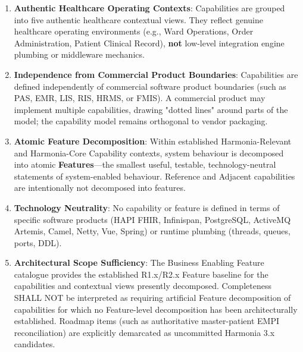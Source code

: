 \begin{enumerate}

\item
\textbf{Authentic Healthcare Operating Contexts}: Capabilities are grouped into five authentic healthcare contextual views. They reflect genuine healthcare operating environments (e.g., Ward Operations, Order Administration, Patient Clinical Record), \textbf{not} low-level integration engine plumbing or middleware mechanics.



\item
\textbf{Independence from Commercial Product Boundaries}: Capabilities are defined independently of commercial software product boundaries (such as PAS, EMR, LIS, RIS, HRMS, or FMIS). A commercial product may implement multiple capabilities, drawing "dotted lines" around parts of the model; the capability model remains orthogonal to vendor packaging.



\item
\textbf{Atomic Feature Decomposition}: Within established Harmonia-Relevant and Harmonia-Core Capability contexts, system behaviour is decomposed into atomic \textbf{Features}—the smallest useful, testable, technology-neutral statements of system-enabled behaviour. Reference and Adjacent capabilities are intentionally not decomposed into features.



\item
\textbf{Technology Neutrality}: No capability or feature is defined in terms of specific software products (HAPI FHIR, Infinispan, PostgreSQL, ActiveMQ Artemis, Camel, Netty, Vue, Spring) or runtime plumbing (threads, queues, ports, DDL).



\item
\textbf{Architectural Scope Sufficiency}: The Business Enabling Feature catalogue provides the established R1.x/\allowbreak{}R2.x Feature baseline for the capabilities and contextual views presently decomposed. Completeness SHALL NOT be interpreted as requiring artificial Feature decomposition of capabilities for which no Feature-level decomposition has been architecturally established. Roadmap items (such as authoritative master-patient EMPI reconciliation) are explicitly demarcated as uncommitted Harmonia 3.x candidates.



\end{enumerate}
\label{rad:enabling:16}

